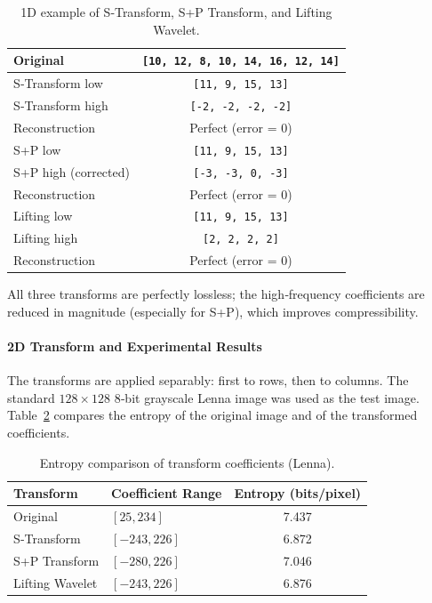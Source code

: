 \begin{table}[H]
\centering
\caption{1D example of S‑Transform, S+P Transform, and Lifting Wavelet.}
\label{tab:1d_example}
\begin{tabular}{|l|c|}
\hline
\textbf{Original} & \texttt{[10, 12, 8, 10, 14, 16, 12, 14]} \\
\hline
S‑Transform low & \texttt{[11, 9, 15, 13]} \\
S‑Transform high & \texttt{[-2, -2, -2, -2]} \\
Reconstruction & Perfect (error = 0) \\
\hline
S+P low & \texttt{[11, 9, 15, 13]} \\
S+P high (corrected) & \texttt{[-3, -3, 0, -3]} \\
Reconstruction & Perfect (error = 0) \\
\hline
Lifting low & \texttt{[11, 9, 15, 13]} \\
Lifting high & \texttt{[2, 2, 2, 2]} \\
Reconstruction & Perfect (error = 0) \\
\hline
\end{tabular}
\end{table}

All three transforms are perfectly lossless; the high‑frequency coefficients are reduced in magnitude (especially for S+P), which improves compressibility.

\paragraph{2D Transform and Experimental Results}
The transforms are applied separably: first to rows, then to columns. The standard \(128\times128\) 8‑bit grayscale Lenna image was used as the test image. Table~\ref{tab:entropy_results} compares the entropy of the original image and of the transformed coefficients.

\begin{table}[H]
\centering
\caption{Entropy comparison of transform coefficients (Lenna).}
\label{tab:entropy_results}
\begin{tabularx}{\textwidth}{|l|X|c|}
\hline
\textbf{Transform} & \textbf{Coefficient Range} & \textbf{Entropy (bits/pixel)} \\
\hline
Original & \([25, 234]\) & 7.437 \\
S‑Transform & \([-243, 226]\) & 6.872 \\
S+P Transform & \([-280, 226]\) & 7.046 \\
Lifting Wavelet & \([-243, 226]\) & 6.876 \\
\hline
\end{tabularx}
\end{table}


